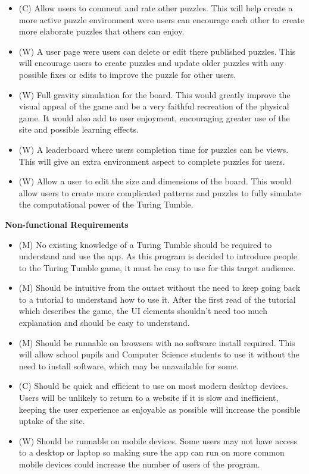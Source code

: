 \documentclass{l4proj}
\begin{document}
\begin{itemize}
    \item (C) Allow users to comment and rate other puzzles. This will help create a more active puzzle environment were users can encourage each other to create more elaborate puzzles that others can enjoy.
    \item (W) A user page were users can delete or edit there published puzzles. This will encourage users to create puzzles and update older puzzles with any possible fixes or edits to improve the puzzle for other users.
    \item (W) Full gravity simulation for the board. This would greatly improve the visual appeal of the game and be a very faithful recreation of the physical game. It would also add to user enjoyment, encouraging greater use of the site and possible learning effects.
    \item (W) A leaderboard where users completion time for puzzles can be views. This will give an extra environment aspect to complete puzzles for users. 
    \item (W) Allow a user to edit the size and dimensions of the board. This would allow users to create more complicated patterns and puzzles to fully simulate the computational power of the Turing Tumble. 
\end{itemize}

\textbf{Non-functional Requirements}
\begin{itemize}
    \item (M) No existing knowledge of a Turing Tumble should be required to understand and use the app. As this program is decided to introduce people to the Turing Tumble game, it must be easy to use for this target audience.
    \item (M) Should be intuitive from the outset without the need to keep going back to a tutorial to understand how to use it. After the first read of the tutorial which describes the game, the UI elements shouldn't need too much explanation and should be easy to understand.
    \item (M) Should be runnable on browsers with no software install required. This will allow school pupils and Computer Science students to use it without the need to install software, which may be unavailable for some.
    \item (C) Should be quick and efficient to use on most modern desktop devices. Users will be unlikely to return to a website if it is slow and inefficient, keeping the user experience as enjoyable as possible will increase the possible uptake of the site.
    \item (W) Should be runnable on mobile devices. Some users may not have access to a desktop or laptop so making sure the app can run on more common mobile devices could increase the number of users of the program.
\end{itemize}
\end{document}
